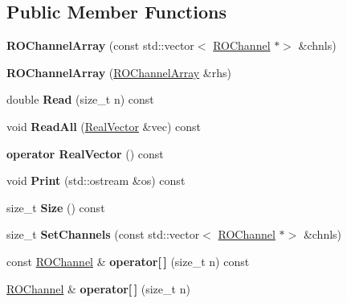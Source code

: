 \subsection*{Public Member Functions}
\begin{DoxyCompactItemize}
\item 
\mbox{\label{classROChannelArray_a7b33e2fd444f313c601aba64352633b9}} 
{\bfseries R\+O\+Channel\+Array} (const std\+::vector$<$ \hyperlink{classROChannel}{R\+O\+Channel} $\ast$$>$ \&chnls)
\item 
\mbox{\label{classROChannelArray_af9ad7e092950b3d27b8cee59026dc2f3}} 
{\bfseries R\+O\+Channel\+Array} (\hyperlink{classROChannelArray}{R\+O\+Channel\+Array} \&rhs)
\item 
\mbox{\label{classROChannelArray_a980b5d5d6cc70f0d1b9f41da31dba00e}} 
double {\bfseries Read} (size\+\_\+t n) const
\item 
\mbox{\label{classROChannelArray_afa6021569c24fad1af7ddd40fc3edf39}} 
void {\bfseries Read\+All} (\hyperlink{classTLAS_1_1Vector}{Real\+Vector} \&vec) const
\item 
\mbox{\label{classROChannelArray_a7da6e826dc0375fec11a6e9337250ee2}} 
{\bfseries operator Real\+Vector} () const
\item 
\mbox{\label{classROChannelArray_a83ade65f4a8b711d4a9f9d1a7e332214}} 
void {\bfseries Print} (std\+::ostream \&os) const
\item 
\mbox{\label{classROChannelArray_a36935a4fcf731ae14e8fcea8f8976e43}} 
size\+\_\+t {\bfseries Size} () const
\item 
\mbox{\label{classROChannelArray_a6dd0570d3023696b171cb24cbf826a98}} 
size\+\_\+t {\bfseries Set\+Channels} (const std\+::vector$<$ \hyperlink{classROChannel}{R\+O\+Channel} $\ast$$>$ \&chnls)
\item 
\mbox{\label{classROChannelArray_afce30ea1ce47974a47b0b4f3ff004dc5}} 
const \hyperlink{classROChannel}{R\+O\+Channel} \& {\bfseries operator\mbox{[}$\,$\mbox{]}} (size\+\_\+t n) const
\item 
\mbox{\label{classROChannelArray_a0046970c2c81701daa34d5d5512de141}} 
\hyperlink{classROChannel}{R\+O\+Channel} \& {\bfseries operator\mbox{[}$\,$\mbox{]}} (size\+\_\+t n)
\end{DoxyCompactItemize}
